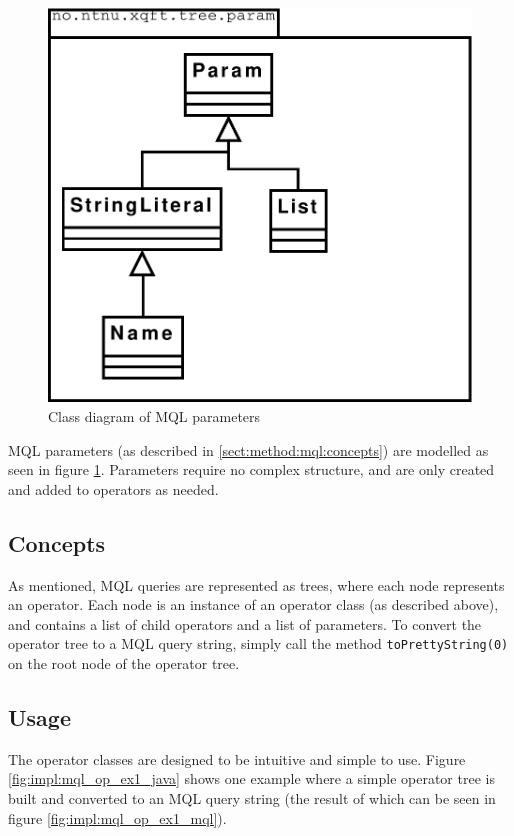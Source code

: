 \begin{figure}[!htp]
\begin{center}
  \includegraphics[scale=0.5]{diagrams/mql_param_uml}
  \caption{Class diagram of MQL parameters}
  \label{fig:impl:mql_param_uml}
\end{center}
\end{figure}

MQL parameters (as described in \ref{sect:method:mql:concepts}) are modelled as
seen in figure \ref{fig:impl:mql_param_uml}. Parameters require no complex
structure, and are only created and added to operators as needed.

\subsection{Concepts}
As mentioned, MQL queries are represented as trees, where each node represents
an operator. Each node is an instance of an operator class (as described
above), and contains a list of child operators and a list of parameters. To
convert the operator tree to a MQL query string, simply call the method
\texttt{toPrettyString(0)} on the root node of the operator tree.

\subsection{Usage}
The operator classes are designed to be intuitive and simple to use. Figure
\ref{fig:impl:mql_op_ex1_java} shows one example where a simple operator tree
is built and converted to an MQL query string (the result of which can be seen
in figure \ref{fig:impl:mql_op_ex1_mql}).

